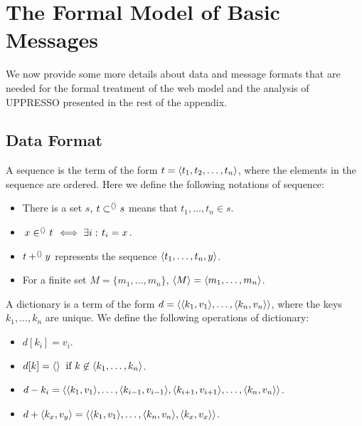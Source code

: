 \newcommand{\Let}[2]{\STATE \textbf{let} #1 := #2 }
\newcommand{\LetND}[2]{\STATE \textbf{let} #1 $\leftarrow$ #2 }

\setcounter{section}{0}
\renewcommand{\thesection}{\Alph{section}}

\appendix

\onecolumn



\section{The Formal Model of Basic Messages}
We now provide some more details about data and message formats that are needed for the formal treatment of the web model and the analysis of UPPRESSO presented in the rest of the appendix.

\subsection{Data Format}
\begin{definition}[Sequence]
A sequence is the term of the form $t=\langle t_1, t_2, \dots, t_n\rangle$, where the elements in the sequence are ordered. Here we define the following notations of sequence:
\begin{itemize}
\item There is a set $s$, $t \subset^{\langle\rangle} s$ means that $t_1,\dots,t_n \in s$. 
\item $\left. x \in^{\langle\rangle} t\right. \iff \exists
  i: \left. t_i = x\right.$.
\item $t +^{\langle\rangle} y$ represents the sequence
  $\langle t_1,\dots,t_n,y\rangle$.  
\item For a finite set $M = \{m_1, \dots,m_n\}$,
  $\langle M\rangle = \langle m_1,\dots,m_n\rangle$. 
\end{itemize}
\end{definition}

\begin{definition}[Dictionary]
A dictionary is a term of the form $d = \langle\langle k_1, v_1\rangle, \dots, \langle k_n, v_n\rangle\rangle$, where the keys $k_1, \dots, k_n$ are unique. We define the following operations of dictionary:
\begin{itemize}
\item $d[k_i]=v_i$.
\item $d[k]=\langle\rangle \text{\;\;if\ } k \not\in \langle k_1, \dots, k_n\rangle$.
\item $d-k_i = \langle\langle k_1, v_1\rangle, \dots, \langle k_{i-1}, v_{i-1}\rangle, \langle k_{i+1}, v_{i+1}\rangle, \dots, \langle k_n, v_n\rangle\rangle$.
\item $d+\langle k_x, v_y\rangle = \langle\langle k_1, v_1\rangle, \dots, \langle k_n, v_n\rangle, \langle k_x, v_x\rangle\rangle$.
\end{itemize}
\end{definition}


